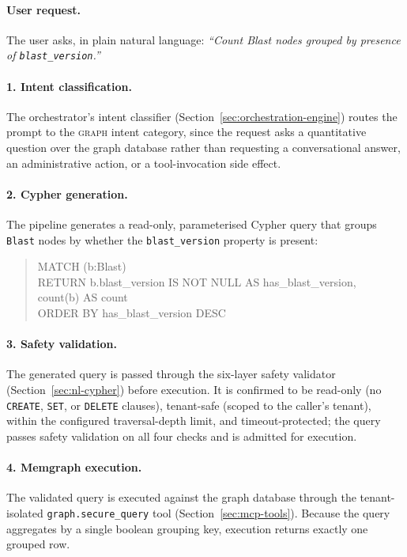 \documentclass[a4paper,noexaminfo]{sapthesis}
\begin{document}
\paragraph{User request.}
The user asks, in plain natural language: \emph{``Count Blast nodes
grouped by presence of \texttt{blast\_version}.''}

\paragraph{1. Intent classification.}
The orchestrator's intent classifier (Section~\ref{sec:orchestration-engine})
routes the prompt to the \textsc{graph} intent category, since the
request asks a quantitative question over the graph database rather than
requesting a conversational answer, an administrative action, or a
tool-invocation side effect.

\paragraph{2. Cypher generation.}
The pipeline generates a read-only, parameterised Cypher query that
groups \texttt{Blast} nodes by whether the \texttt{blast\_version}
property is present:
\begin{quote}
\ttfamily\small
MATCH (b:Blast)\\
RETURN b.blast\_version IS NOT NULL AS has\_blast\_version,\\
\phantom{RETURN }count(b) AS count\\
\phantom{RETURN }ORDER BY has\_blast\_version DESC
\end{quote}

\paragraph{3. Safety validation.}
The generated query is passed through the six-layer safety validator
(Section~\ref{sec:nl-cypher}) before execution.  It is confirmed to be
read-only (no \texttt{CREATE}, \texttt{SET}, or \texttt{DELETE} clauses),
tenant-safe (scoped to the caller's tenant), within the configured
traversal-depth limit, and timeout-protected; the query passes safety
validation on all four checks and is admitted for execution.

\paragraph{4. Memgraph execution.}
The validated query is executed against the graph database through the
tenant-isolated \texttt{graph.secure\_query} tool
(Section~\ref{sec:mcp-tools}).  Because the query aggregates by a single
boolean grouping key, execution returns exactly one grouped row.
\end{document}
